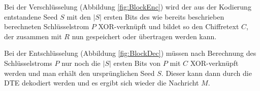Bei der Verschlüsselung (Abbildung \ref{fig:BlockEnc}) wird der aus der Kodierung entstandene Seed \(S\) mit den \(|S|\) ersten Bits des wie bereits beschrieben berechneten Schlüsselstrom \(P\) XOR-verknüpft und bildet so den Chiffretext \(C\), der zusammen mit \(R\) nun gespeichert oder übertragen werden kann.

Bei der Entschlüsselung (Abbildung \ref{fig:BlockDec}) müssen nach Berechnung des Schlüsselstroms \(P\) nur noch die \(|S|\) ersten Bits von \(P\) mit \(C\) XOR-verknüpft werden und man erhält den ursprünglichen Seed \(S\). Dieser kann dann durch die DTE  dekodiert werden und es ergibt sich wieder die Nachricht \(M\).

\newpage